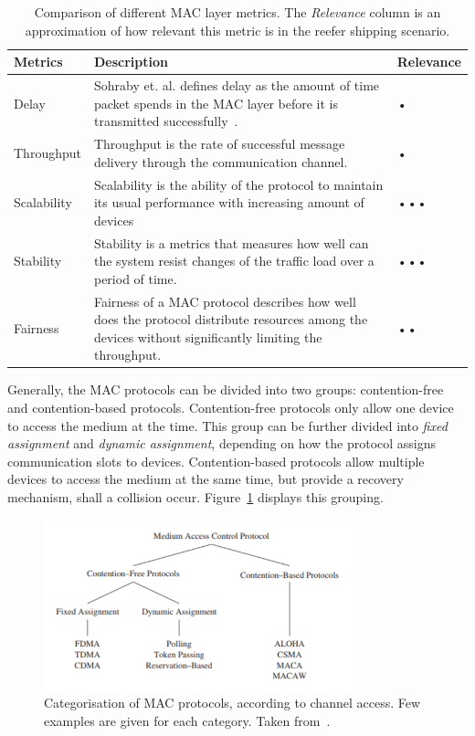 \begin{table}[htbp]
    \centering
    \begin{tabularx}{\textwidth}{|l|X|p{5em}|}
    \hline
    \textbf{Metrics}&\textbf{Description}&\textbf{Relevance}\\
    \hline
    Delay&Sohraby et. al. defines delay as the amount of time packet spends in the MAC layer before it is transmitted successfully~\cite{Sohraby2007WirelessApplications}.&•\\
    \hline
    Throughput&Throughput is the rate of successful message delivery through the communication channel.&•\\
    \hline
    Scalability&Scalability is the ability of the protocol to maintain its usual performance with increasing amount of devices&•••\\
    \hline
    Stability&Stability is a metrics that measures how well can the system resist changes of the traffic load over a period of time.&•••\\
    \hline
    Fairness&Fairness of a MAC protocol describes how well does the protocol distribute resources among the devices without significantly limiting the throughput.&••\\
    \hline
    \end{tabularx}
    \caption{Comparison of different MAC layer metrics. The \textit{Relevance} column is an approximation of how relevant this metric is in the reefer shipping scenario.}
    \label{tab:mac-metrics}
\end{table}

Generally, the MAC protocols can be divided into two groups: contention-free and contention-based protocols. Contention-free protocols only allow one device to access the medium at the time. This group can be further divided into \textit{fixed assignment} and \textit{dynamic assignment}, depending on how the protocol assigns communication slots to devices. Contention-based protocols allow multiple devices to access the medium at the same time, but provide a recovery mechanism, shall a collision occur. Figure~\ref{fig:mac-categories} displays this grouping.

\begin{figure}[ht]
    \centering
    \includegraphics[width=0.8\textwidth]{00images/mac-categories}
    \caption{Categorisation of MAC protocols, according to channel access. Few examples are given for each category. Taken from~\cite{2011MediumControl}.}
    \label{fig:mac-categories}
\end{figure}